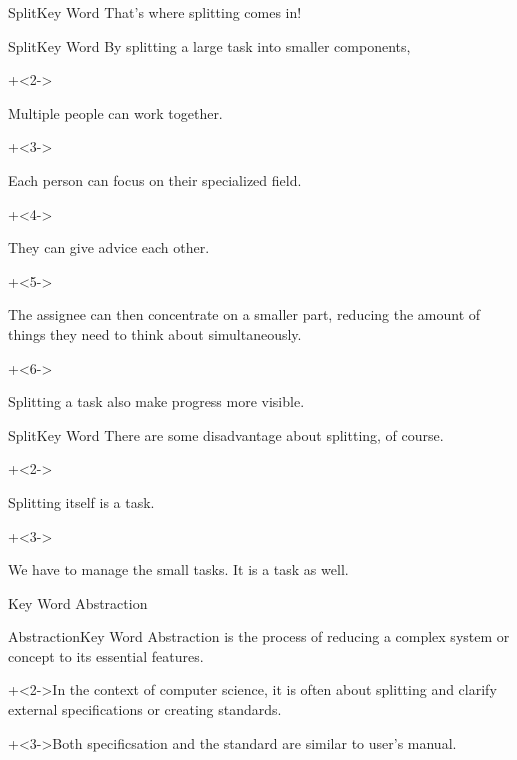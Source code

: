 \begin{frame}{Split}{Key Word}
    {\Large That's where splitting comes in!}
\end{frame}


\begin{frame}{Split}{Key Word}
    By splitting a large task into smaller components,
    \vspace{4ex}

    \begin{itemize}
        \onslide+<2->{\item Multiple people can work together.
            \begin{itemize}
                \onslide+<3->{\item Each person can focus on their specialized field.}
                \onslide+<4->{\item They can give advice each other.}
            \end{itemize}}
        \onslide+<5->{\item The assignee can then concentrate on a smaller part, reducing the amount of things they need to think about simultaneously.}
        \onslide+<6->{\item Splitting a task also make progress more visible.}
    \end{itemize}
\end{frame}


\begin{frame}{Split}{Key Word}
    There are some disadvantage about splitting, of course.
    \vspace{4ex}

    \begin{itemize}
        \onslide+<2->{\item Splitting itself is a task.}
        \onslide+<3->{\item We have to manage the small tasks. It is a task as well.}
    \end{itemize}
\end{frame}


\begin{frame}{Key Word}{}
    {\Huge Abstraction}
\end{frame}


\begin{frame}{Abstraction}{Key Word}
    Abstraction is the process of reducing a complex system or concept to its essential features.
    \vspace{4ex}

    \onslide+<2->{In the context of computer science, it is often about splitting and clarify external specifications or creating standards.}
    \vspace{2ex}

    \onslide+<3->{Both specificsation and the standard are similar to user's manual.}
\end{frame}


